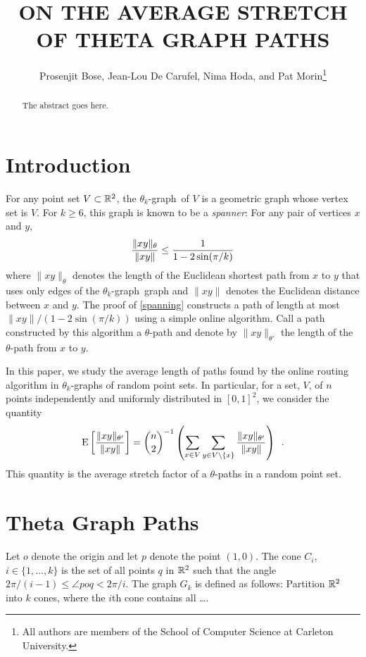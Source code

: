 \documentclass{patmorin}
\title{\MakeUppercase{On the Average Stretch of Theta Graph Paths}}
\author{Prosenjit Bose,
        Jean-Lou De Carufel,
        Nima Hoda, and
        Pat Morin\thanks{All authors are members of the School of Computer Science at Carleton University.}}
\begin{document}
\maketitle

\begin{abstract}
  The abstract goes here.
\end{abstract}

\newcommand{\tkgraph}{$\theta_k$-graph}

\section{Introduction}

For any point set $V\subset\mathbb{R}^2$, the \tkgraph\ of $V$ \cite{keilXX}
is a geometric graph whose vertex set is $V$.  For $k\ge 6$, this graph
is known to be a \emph{spanner}:  For any pair of vertices $x$ and $y$,
\begin{equation}
     \frac{\|xy\|_\theta}{\|xy\|} \le \frac{1}{1-2\sin(\pi/k)} \eqlabel{spanning}
\end{equation}
where $\|xy\|_\theta$ denotes the length of the Euclidean shortest
path from $x$ to $y$ that uses only edges of the \tkgraph\ graph
and $\|xy\|$ denotes the Euclidean distance between $x$ and $y$.
The proof of \eqref{spanning} constructs a path of length at most
$\|xy\|/(1-2\sin(\pi/k))$ using a simple online algorithm.  Call a path constructed by this algorithm a $\theta$-path and denote by
$\|xy\|_{\theta'}$ the length of the $\theta$-path from $x$ to $y$.

In this paper, we study the average length of paths found by the online
routing algorithm in \tkgraph s of random point sets.  In particular, for a set, $V$, of $n$ points independently and uniformly distributed in $[0,1]^2$, we consider the quantity
\[
   \mathrm{E}\left[\frac{\|xy\|_{\theta'}}{\|xy\|}\right]
 =      \binom{n}{2}^{-1}
        \left(
          \sum_{x\in V}
          \sum_{y\in V\setminus\{x\}} \frac{\|xy\|_{\theta'}}{\|xy\|}
        \right) \enspace .
\]
This quantity is the average stretch factor of a $\theta$-paths in a
random point set.

\section{Theta Graph Paths}

Let $o$ denote the origin and let $p$ denote the point $(1,0)$.  The cone
$C_i$, $i\in\{1,\ldots,k\}$ is the set of all points $q$ in $\mathbb{R}^2$ such
that the angle $2\pi/(i-1)\le \angle poq < 2\pi/i$.  The graph $G_k$
is defined as follows:  Partition $\mathbb{R}^2$ into $k$ cones, where the $i$th
cone contains all \ldots.
\end{document}
